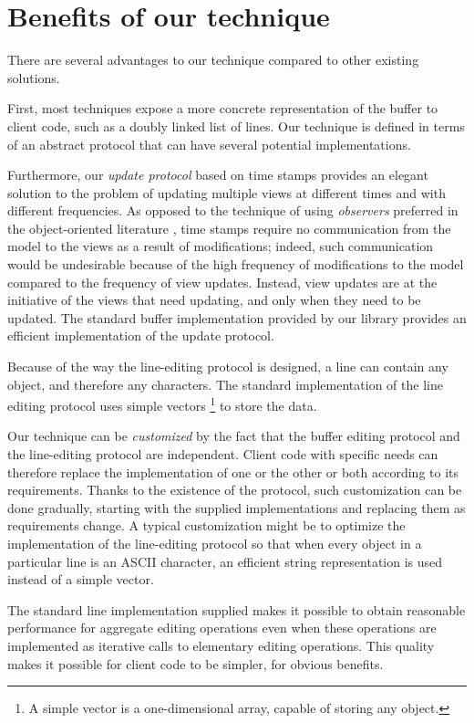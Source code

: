 \section{Benefits of our technique}
 
There are several advantages to our technique compared to other
existing solutions.

First, most techniques expose a more concrete representation of the
buffer to client code, such as a doubly linked list of lines.  Our
technique is defined in terms of an abstract \clos{} protocol that can
have several potential implementations.

Furthermore, our \emph{update protocol} based on time stamps provides
an elegant solution to the problem of updating multiple views at
different times and with different frequencies.  As opposed to the
technique of using \emph{observers} preferred in the object-oriented
literature \cite{Gamma:1998:DPC:551551}, time stamps require no
communication from the model to the views as a result of
modifications; indeed, such communication would be undesirable because
of the high frequency of modifications to the model compared to the
frequency of view updates.  Instead, view updates are at the
initiative of the views that need updating, and only when they need to
be updated.  The standard buffer implementation provided by our
library provides an efficient implementation of the update protocol.

Because of the way the line-editing protocol is designed, a line can
contain any \commonlisp{} object, and therefore any characters.  The
standard implementation of the line editing protocol uses simple
vectors%
\footnote{A simple vector is a \commonlisp{} one-dimensional array,
  capable of storing any \commonlisp{} object.}
to store the data.

Our technique can be \emph{customized} by the fact that the buffer
editing protocol and the line-editing protocol are independent.
Client code with specific needs can therefore replace the
implementation of one or the other or both according to its
requirements.  Thanks to the existence of the \clos{} protocol, such
customization can be done gradually, starting with the supplied
implementations and replacing them as requirements change.  A typical
customization might be to optimize the implementation of the
line-editing protocol so that when every object in a particular line
is an ASCII character, an efficient string representation is
used instead of a simple vector.

The standard line implementation supplied makes it possible to obtain
reasonable performance for aggregate editing operations even when
these operations are implemented as iterative calls to elementary
editing operations.  This quality makes it possible for client code to
be simpler, for obvious benefits.

